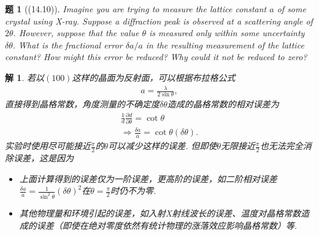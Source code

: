 \documentclass[UTF8,10pt,a4paper]{article}
\theoremstyle{Problem}
\newtheorem{prob}{题}
\theoremstyle{Solution}
\newtheorem*{sol}{解}
\begin{document}
\begin{prob}[(14.10)]
    Imagine you are trying to measure the lattice constant $a$ of some crystal using X-ray. Suppose a diffraction peak is observed at a scattering angle of $2\theta$. However, suppose that the value $\theta$ is measured only within some uncertainty $\delta\theta$. What is the fractional error $\delta a/a$ in the resulting measurement of the lattice constant? How might this error be reduced? Why could it not be reduced to zero?
\end{prob}
\begin{sol}
    若以$(100)$这样的晶面为反射面，可以根据布拉格公式
    \begin{align}
        a=\frac{\lambda}{2\sin\theta},
    \end{align}
    直接得到晶格常数，角度测量的不确定度$\delta\theta$造成的晶格常数的相对误差为
    \begin{gather}
        \frac{1}{d}\frac{\partial d}{\partial\theta}=\cot\theta\\
        \Longrightarrow\frac{\delta a}{a}=\cot\theta(\delta\theta).
    \end{gather}
    实验时使用尽可能接近$\frac{\pi}{2}$的$\theta$可以减少这样的误差. 但即使$\theta$无限接近$\frac{\pi}{2}$也无法完全消除误差，这是因为
    \begin{itemize}
        \item 上面计算得到的误差仅为一阶误差，更高阶的误差，如二阶相对误差$\frac{\delta a}{a}=\frac{1}{\sin^2\theta}(\delta\theta)^2$在$\theta=\frac{\pi}{2}$时仍不为零.
        \item 其他物理量和环境引起的误差，如入射X射线波长的误差、温度对晶格常数造成的误差（即使在绝对零度依然有统计物理的涨落效应影响晶格常数）等.
    \end{itemize}
\end{sol}
\end{document}
